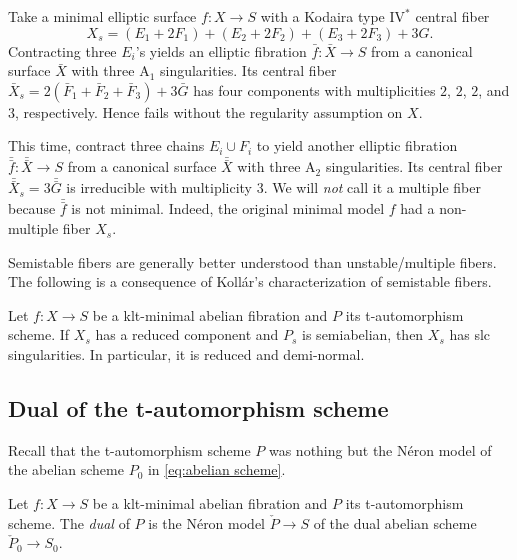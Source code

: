 \documentclass[reqno, letterpaper]{amsart}
\numberwithin{equation}{subsection}
\let\to\longrightarrow
\begin{document}
		\begin{example} \label{ex:counterexample for reduced component}
			Take a minimal elliptic surface $f : X \to S$ with a Kodaira type $\mathrm {IV}^*$ central fiber
			\[ X_s = (E_1 + 2F_1) + (E_2 + 2F_2) + (E_3 + 2F_3) + 3G .\]
			Contracting three $E_i$'s yields an elliptic fibration $\bar f : \bar X \to S$ from a canonical surface $\bar X$ with three $\mathrm A_1$ singularities. Its central fiber $\bar X_s = 2(\bar F_1 + \bar F_2 + \bar F_3) + 3\bar G$ has four components with multiplicities $2$, $2$, $2$, and $3$, respectively. Hence  fails without the regularity assumption on $X$.
			
			This time, contract three chains $E_i \cup F_i$ to yield another elliptic fibration $\bar {\bar f} : \bar {\bar X} \to S$ from a canonical surface $\bar {\bar X}$ with three $\mathrm A_2$ singularities. Its central fiber $\bar {\bar X}_s = 3\bar {\bar G}$ is irreducible with multiplicity $3$. We will \emph{not} call it a multiple fiber because $\bar {\bar f}$ is not minimal. Indeed, the original minimal model $f$ had a non-multiple fiber $X_s$.
		\end{example}
		
		Semistable fibers are generally better understood than unstable/multiple fibers. The following is a consequence of Koll\'ar's characterization of semistable fibers.
		
		\begin{theorem}  \label{thm:Kollar semistable}
			Let $f : X \to S$ be a klt-minimal abelian fibration and $P$ its t-automorphism scheme. If $X_s$ has a reduced component and $P_s$ is semiabelian, then $X_s$ has slc singularities. In particular, it is reduced and demi-normal.
		\end{theorem}
		
		
		
	\subsection{Dual of the t-automorphism scheme} \label{sec:dual Neron model}
		Recall that the t-automorphism scheme $P$ was nothing but the N\'eron model of the abelian scheme $P_0$ in \eqref{eq:abelian scheme}.
		
		\begin{definition}
			Let $f : X \to S$ be a klt-minimal abelian fibration and $P$ its t-automorphism scheme. The \emph{dual} of $P$ is the N\'eron model $\check P \to S$ of the dual abelian scheme $\check P_0 \to S_0$.
		\end{definition}
		
\end{document}
